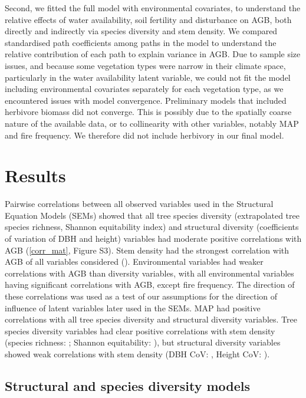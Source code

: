 \documentclass[12pt,a4paper]{article}
\begin{document}
Second, we fitted the full model with environmental covariates, to understand the relative effects of water availability, soil fertility and disturbance on AGB, both directly and indirectly via species diversity and stem density. We compared standardised path coefficients among paths in the model to understand the relative contribution of each path to explain variance in AGB. Due to sample size issues, and because some vegetation types were narrow in their climate space, particularly in the water availability latent variable, we could not fit the model including environmental covariates separately for each vegetation type, as we encountered issues with model convergence. Preliminary models that included herbivore biomass \citep{Hempson2017} did not converge. This is possibly due to the spatially coarse nature of the available data, or to collinearity with other variables, notably MAP and fire frequency. We therefore did not include herbivory in our final model.

\section{Results}

Pairwise correlations between all observed variables used in the Structural Equation Models (SEMs) showed that all tree species diversity (extrapolated tree species richness, Shannon equitability index) and structural diversity (coefficients of variation of DBH and height) variables had moderate positive correlations with AGB (\autoref{corr_mat}, Figure S3). Stem density had the strongest correlation with AGB of all variables considered (\ccib{}). Environmental variables had weaker correlations with AGB than diversity variables, with all environmental variables having significant correlations with AGB, except fire frequency. The direction of these correlations was used as a test of our assumptions for the direction of influence of latent variables later used in the SEMs. MAP had positive correlations with all tree species diversity and structural diversity variables. Tree species diversity variables had clear positive correlations with stem density (species richness: \ccsi{}; Shannon equitability: \ccei{}), but structural diversity variables showed weak correlations with stem density (DBH CoV: \ccdvi{}, Height CoV: \cchvi{}).

\subsection{Structural and species diversity models}
\end{document}
